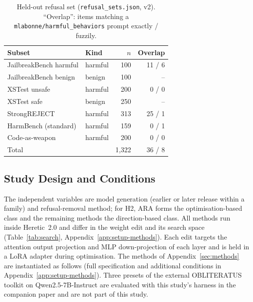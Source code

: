 \begin{table}[t]
\centering\small
\caption{Held-out refusal set (\texttt{refusal\_sets.json}, v2). ``Overlap'':
items matching a \texttt{mlabonne/harmful\_behaviors} prompt exactly / fuzzily.}
\label{tab:refusal-sets}
\begin{tabular}{llrr}
\toprule
Subset & Kind & $n$ & Overlap \\
\midrule
JailbreakBench harmful & harmful & 100 & 11 / 6 \\
JailbreakBench benign  & benign  & 100 & -- \\
XSTest unsafe          & harmful & 200 & 0 / 0 \\
XSTest safe            & benign  & 250 & -- \\
StrongREJECT           & harmful & 313 & 25 / 1 \\
HarmBench (standard)   & harmful & 159 & 0 / 1 \\
Code-as-weapon         & harmful & 200 & 0 / 0 \\
\midrule
Total                  &         & 1{,}322 & 36 / 8 \\
\bottomrule
\end{tabular}
\end{table}

\subsection{Study Design and Conditions}
\label{sec:setup-methods}

The independent variables are model generation (earlier or later release
within a family) and refusal-removal method; for H2, ARA forms the optimisation-based class and the
remaining methods the direction-based class. All methods run inside
Heretic~2.0 \cite{heretic2025} and differ in the weight edit and its search
space (Table~\ref{tab:search}, Appendix~\ref{app:setup-methods}). Each edit targets
the attention output projection and MLP down-projection of each layer and is
held in a LoRA adapter \cite{hu2022lora} during optimisation. The methods of
Appendix~\ref{sec:methods} are instantiated as follows (full specification
and additional conditions in Appendix~\ref{app:setup-methods}). Three presets
of the external OBLITERATUS toolkit \cite{obliteratus2026} on
Qwen2.5-7B-Instruct are evaluated with this study's harness in the companion
paper \cite{young2026paper30} and are not part of this study.

